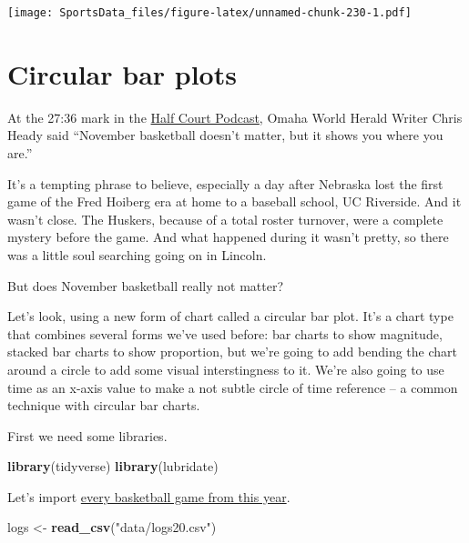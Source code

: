 \documentclass[
]{book}
\newenvironment{Shaded}{\begin{snugshade}}{\end{snugshade}}
\newcommand{\KeywordTok}[1]{\textcolor[rgb]{0.13,0.29,0.53}{\textbf{#1}}}
\newcommand{\NormalTok}[1]{#1}
\newcommand{\StringTok}[1]{\textcolor[rgb]{0.31,0.60,0.02}{#1}}
\begin{document}
\texttt{[image: SportsData\_files/figure-latex/unnamed-chunk-230-1.pdf]}

\hypertarget{circular-bar-plots}{%
\chapter{Circular bar plots}\label{circular-bar-plots}}

At the 27:36 mark in the \href{https://www.omaha.com/sports/podcasts/half-court-press/half-court-press-creighton-cruises-in-opener-nebraska-stunned-in/article_67081a35-3a8f-5e9e-ae67-e88fcacbb362.html}{Half Court Podcast}, Omaha World Herald Writer Chris Heady said ``November basketball doesn't matter, but it shows you where you are.''

It's a tempting phrase to believe, especially a day after Nebraska lost the first game of the Fred Hoiberg era at home to a baseball school, UC Riverside. And it wasn't close. The Huskers, because of a total roster turnover, were a complete mystery before the game. And what happened during it wasn't pretty, so there was a little soul searching going on in Lincoln.

But does November basketball really not matter?

Let's look, using a new form of chart called a circular bar plot. It's a chart type that combines several forms we've used before: bar charts to show magnitude, stacked bar charts to show proportion, but we're going to add bending the chart around a circle to add some visual interstingness to it. We're also going to use time as an x-axis value to make a not subtle circle of time reference -- a common technique with circular bar charts.

First we need some libraries.

\begin{Shaded}
\begin{Highlighting}[]
\KeywordTok{library}\NormalTok{(tidyverse)}
\KeywordTok{library}\NormalTok{(lubridate)}
\end{Highlighting}
\end{Shaded}

Let's import \href{https://unl.box.com/s/wnlh0u9low1yh56enion8zjmu8r7dc8p}{every basketball game from this year}.

\begin{Shaded}
\begin{Highlighting}[]
\NormalTok{logs <-}\StringTok{ }\KeywordTok{read_csv}\NormalTok{(}\StringTok{"data/logs20.csv"}\NormalTok{)}
\end{Highlighting}
\end{Shaded}
\end{document}
